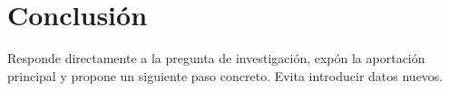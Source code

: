 \section{Conclusión}
Responde directamente a la pregunta de investigación, expón la aportación
principal y propone un siguiente paso concreto. Evita introducir datos nuevos.
